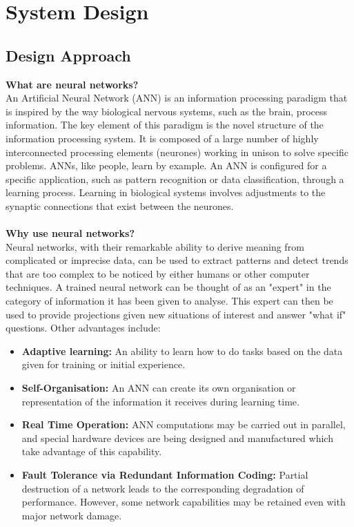 \chapter{System Design}
\section{Design Approach}
\textbf{What are neural networks?}\\
An Artificial Neural Network (ANN) is an information processing paradigm that is inspired by the way biological nervous systems, such as the brain, process information. The key element of this paradigm is the novel structure of the information processing system. It is composed of a large number of highly interconnected processing elements (neurones) working in unison to solve specific problems. ANNs, like people, learn by example. An ANN is configured for a specific application, such as pattern recognition or data classification, through a learning process. Learning in biological systems involves adjustments to the synaptic connections that exist between the neurones.\\\\
\textbf{Why use neural networks?}\\
Neural networks, with their remarkable ability to derive meaning from complicated or imprecise data, can be used to extract patterns and detect trends that are too complex to be noticed by either humans or other computer techniques. A trained neural network can be thought of as an "expert" in the category of information it has been given to analyse. This expert can then be used to provide projections given new situations of interest and answer "what if" questions. Other advantages include:
\begin{itemize}
	\item \textbf{Adaptive learning:} An ability to learn how to do tasks based on the data given for training or initial experience.
	\item \textbf{Self-Organisation:} An ANN can create its own organisation or representation of the information it receives during learning time.
	\item \textbf{Real Time Operation:} ANN computations may be carried out in parallel, and special hardware devices are being designed and manufactured which take advantage of this capability.
	\item \textbf{Fault Tolerance via Redundant Information Coding:} Partial destruction of a network leads to the corresponding degradation of performance. However, some network capabilities may be retained even with major network damage.
\end{itemize}

